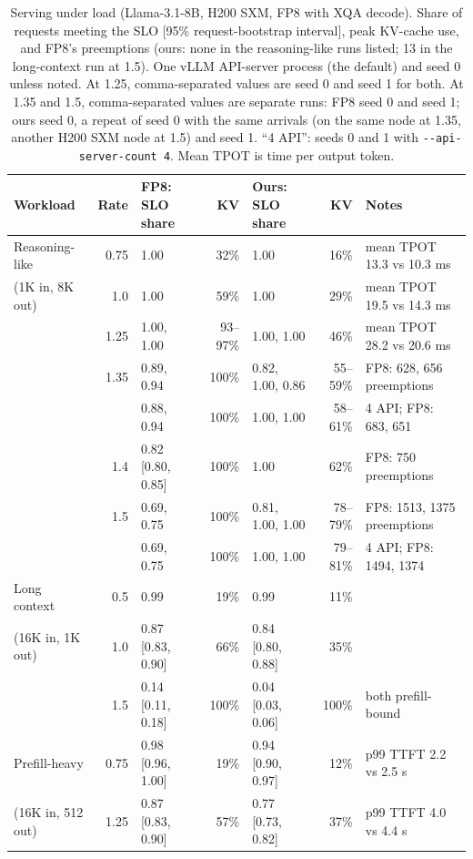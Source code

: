 \documentclass[11pt]{article}
\begin{document}
\begin{table}[tbp]
\centering
\caption{Serving under load (Llama-3.1-8B, H200 SXM, FP8 with XQA decode). Share of requests meeting the SLO [95\% request-bootstrap interval], peak KV-cache use, and FP8's preemptions (ours: none in the reasoning-like runs listed; 13 in the long-context run at 1.5). One vLLM API-server process (the default) and seed 0 unless noted. At 1.25, comma-separated values are seed 0 and seed 1 for both. At 1.35 and 1.5, comma-separated values are separate runs: FP8 seed 0 and seed 1; ours seed 0, a repeat of seed 0 with the same arrivals (on the same node at 1.35, another H200 SXM node at 1.5) and seed 1. ``4 API'': seeds 0 and 1 with \texttt{-{}-api-server-count 4}. Mean TPOT is time per output token.}
\label{tab:serve}
\small\setlength{\tabcolsep}{2.5pt}
\begin{tabular}{@{}lrlrlrl@{}}
\toprule
Workload & Rate & FP8: SLO share & KV & Ours: SLO share & KV & Notes \\
\midrule
Reasoning-like  & 0.75 & 1.00 & 32\% & 1.00 & 16\% & mean TPOT 13.3 vs 10.3 ms \\
(1K in, 8K out) & 1.0  & 1.00 & 59\% & 1.00 & 29\% & mean TPOT 19.5 vs 14.3 ms \\
                & 1.25 & 1.00, 1.00 & 93--97\% & 1.00, 1.00 & 46\% & mean TPOT 28.2 vs 20.6 ms \\
                & 1.35 & 0.89, 0.94 & 100\% & 0.82, 1.00, 0.86 & 55--59\% & FP8: 628, 656 preemptions \\
                &      & 0.88, 0.94 & 100\% & 1.00, 1.00 & 58--61\% & 4 API; FP8: 683, 651 \\
                & 1.4  & 0.82 [0.80, 0.85] & 100\% & 1.00 & 62\% & FP8: 750 preemptions \\
                & 1.5  & 0.69, 0.75 & 100\% & 0.81, 1.00, 1.00 & 78--79\% & FP8: 1513, 1375 preemptions \\
                &      & 0.69, 0.75 & 100\% & 1.00, 1.00 & 79--81\% & 4 API; FP8: 1494, 1374 \\
\midrule
Long context    & 0.5  & 0.99 & 19\% & 0.99 & 11\% & \\
(16K in, 1K out) & 1.0 & 0.87 [0.83, 0.90] & 66\% & 0.84 [0.80, 0.88] & 35\% & \\
                & 1.5  & 0.14 [0.11, 0.18] & 100\% & 0.04 [0.03, 0.06] & 100\% & both prefill-bound \\
\midrule
Prefill-heavy   & 0.75 & 0.98 [0.96, 1.00] & 19\% & 0.94 [0.90, 0.97] & 12\% & p99 TTFT 2.2 vs 2.5 s \\
(16K in, 512 out) & 1.25 & 0.87 [0.83, 0.90] & 57\% & 0.77 [0.73, 0.82] & 37\% & p99 TTFT 4.0 vs 4.4 s \\
\bottomrule
\end{tabular}
\end{table}
\end{document}
